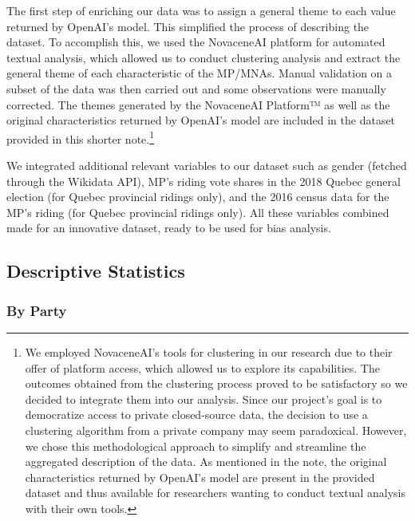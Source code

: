 \documentclass{article}
\begin{document}
The first step of enriching our data was to assign a general theme to each value returned by OpenAI's model. This simplified the process of describing the dataset. To accomplish this, we used the NovaceneAI \parencite{novaceneaiplatformtm23} platform for automated textual analysis, which allowed us to conduct clustering analysis and extract the general theme of each characteristic of the MP/MNAs. Manual validation on a subset of the data was then carried out and some observations were manually corrected. The themes generated by the NovaceneAI Platform™ as well as the original characteristics returned by OpenAI's model are included in the dataset provided in this shorter note.\footnote{We employed NovaceneAI's tools for clustering in our research due to their offer of platform access, which allowed us to explore its capabilities. The outcomes obtained from the clustering process proved to be satisfactory so we decided to integrate them into our analysis. Since our project's  goal is to democratize access to private closed-source data, the decision to use a clustering algorithm from a private company may seem paradoxical. However, we chose this methodological approach to simplify and streamline the aggregated description of the data. As mentioned in the note, the original characteristics returned by OpenAI's model are present in the provided dataset and thus available for researchers wanting to conduct textual analysis with their own tools.}

We integrated additional relevant variables to our dataset such as gender (fetched through the Wikidata API),  MP's riding vote shares in the 2018 Quebec general election (for Quebec provincial ridings only), and the 2016 census data for the MP's riding (for Quebec provincial ridings only). All these variables combined made for an innovative dataset, ready to be used for bias analysis.

\subsection{Descriptive Statistics}

\subsubsection{By Party}
\end{document}
